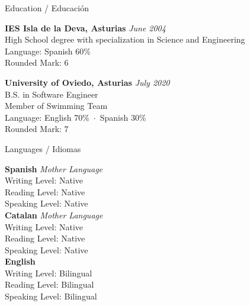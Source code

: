 \documentclass{resume} %
\begin{document}

\begin{rSection}{Education / Educación}

{\bf IES Isla de la Deva, Asturias} \hfill {\em June 2004} \\ 
High School degree with specialization in Science and Engineering \\
Language: Spanish 60\% \\
Rounded Mark: 6

{\bf University of Oviedo, Asturias} \hfill {\em July 2020} \\ 
B.S. in Software Engineer \\
Member of Swimming Team \\
Language: English 70\%~$\cdot$~Spanish 30\% \\
Rounded Mark: 7

\end{rSection}


\begin{rSection}{Languages / Idiomas}

{\bf Spanish} \hfill {\em Mother Language}\\ 
Writing Level: Native \\
Reading Level: Native \\
Speaking Level: Native \\

{\bf Catalan} \hfill {\em Mother Language}\\ 
Writing Level: Native \\
Reading Level: Native \\
Speaking Level: Native \\

{\bf English} \\ 
Writing Level: Bilingual \\
Reading Level: Bilingual \\
Speaking Level: Bilingual \\

\end{rSection}

\end{document}
